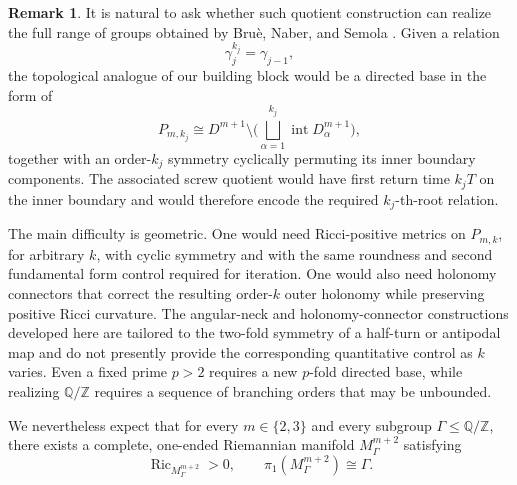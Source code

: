 \documentclass[11pt,reqno]{amsart}
\theoremstyle{definition}
\newtheorem{remark}[theorem]{Remark}
\numberwithin{equation}{section}
\DeclareMathOperator{\Ric}{Ric}
\begin{document}
\begin{remark}\label{rem:beyond-binary}
It is natural to ask whether such quotient construction can realize the
full range of groups obtained by Bru\`e, Naber, and Semola
\cite{BNS7,BNS6}.  Given a
relation
\[
 \gamma_j^{k_j}=\gamma_{j-1},
\]
the topological analogue of our building block would be a directed base in the form of
\[
 P_{m,k_j}
 \cong
 D^{m+1}\setminus
 \biggl(
   \bigsqcup_{\alpha=1}^{k_j}
   \operatorname{int}D^{m+1}_\alpha
 \biggr),
\]
together with an order-$k_j$ symmetry cyclically permuting its inner
boundary components.  The associated screw quotient would have first
return time $k_jT$ on the inner boundary and would therefore encode the
required $k_j$-th-root relation.

The main difficulty is geometric.  One would need Ricci-positive
metrics on $P_{m,k}$, for arbitrary $k$, with cyclic symmetry and with
the same roundness and second fundamental form control required for
iteration.  One would also need holonomy connectors that correct the
resulting order-$k$ outer holonomy while preserving positive Ricci
curvature.  The angular-neck and holonomy-connector constructions developed
here are tailored to the two-fold symmetry of a half-turn or antipodal
map and do not presently provide the corresponding quantitative control
as $k$ varies.  Even a fixed prime $p>2$ requires a new $p$-fold directed
base, while realizing $\mathbb Q/\mathbb Z$ requires a sequence of
branching orders that may be unbounded.

We nevertheless expect that for every $m\in\{2,3\}$ and every subgroup
$\Gamma\le\mathbb Q/\mathbb Z$, there exists a complete, one-ended
Riemannian manifold $M^{m+2}_\Gamma$ satisfying
\[
 \Ric_{M^{m+2}_\Gamma}>0,
 \qquad
 \pi_1(M^{m+2}_\Gamma)\cong\Gamma.
\]
\end{remark}
\end{document}
